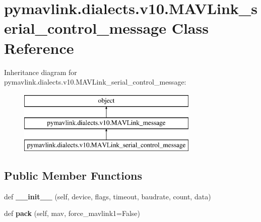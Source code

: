 \hypertarget{classpymavlink_1_1dialects_1_1v10_1_1MAVLink__serial__control__message}{}\section{pymavlink.\+dialects.\+v10.\+M\+A\+V\+Link\+\_\+serial\+\_\+control\+\_\+message Class Reference}
\label{classpymavlink_1_1dialects_1_1v10_1_1MAVLink__serial__control__message}
Inheritance diagram for pymavlink.\+dialects.\+v10.\+M\+A\+V\+Link\+\_\+serial\+\_\+control\+\_\+message\+:\begin{figure}[H]
\begin{center}
\leavevmode
\includegraphics[height=3.000000cm]{classpymavlink_1_1dialects_1_1v10_1_1MAVLink__serial__control__message}
\end{center}
\end{figure}
\subsection*{Public Member Functions}
\begin{DoxyCompactItemize}
\item 
\mbox{\label{classpymavlink_1_1dialects_1_1v10_1_1MAVLink__serial__control__message_a8278a3ba2d78a269fb83e4605dd8916a}} 
def {\bfseries \+\_\+\+\_\+init\+\_\+\+\_\+} (self, device, flags, timeout, baudrate, count, data)
\item 
\mbox{\label{classpymavlink_1_1dialects_1_1v10_1_1MAVLink__serial__control__message_ac86fd997ff448924b8e99adb4e6ae05c}} 
def {\bfseries pack} (self, mav, force\+\_\+mavlink1=False)
\end{DoxyCompactItemize}
